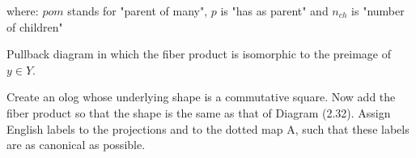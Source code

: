 \documentclass{article}
\begin{document}
\begin{center}
\end{center}

where: $pom$ stands for "parent of many", $p$ is "has as parent" and $n_{ch}$
is "number of children"


Pullback diagram in which the fiber product is isomorphic to the preimage of $y \in Y$.

\ans

\begin{center}
\end{center}


Create an olog whose underlying shape is a commutative square. Now add the
fiber product so that the shape is the same as that of Diagram (2.32). Assign
English labels to the projections and to the dotted map A, such that these
labels are as canonical as possible.

\ans

\unsure
\end{document}
